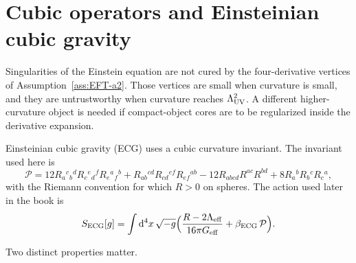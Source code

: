 \section{Cubic operators and Einsteinian cubic gravity}
\label{sec:ch9-ECG}

Singularities of the Einstein equation are not cured by the
four-derivative vertices of Assumption~\ref{ass:EFT-a2}. Those
vertices are small when curvature is small, and they are
untrustworthy when curvature reaches \(\Lambda_{\mathrm{UV}}^2\). A different
higher-curvature object is needed if compact-object cores are to
be regularized inside the derivative expansion.

Einsteinian cubic gravity (ECG) uses a cubic curvature invariant.
The invariant used here is
\begin{equation}
  \label{eq:ECG}
  \mathcal{P}
  =12 R_a{}^c{}_b{}^d R_c{}^e{}_d{}^f R_e{}^a{}_f{}^b
   +R_{ab}{}^{cd}R_{cd}{}^{ef}R_{ef}{}^{ab}
   -12R_{abcd}R^{ac}R^{bd}
   +8R_a{}^bR_b{}^cR_c{}^a,
\end{equation}
with the Riemann convention for which \(R>0\) on spheres. The action
used later in the book is
\begin{equation}
  \label{eq:S-ECG}
  S_{\mathrm{ECG}}[g]
  =\int\mathrm{d}^4x\,\sqrt{-g}
   \Bigl(
     \frac{R-2\Lambda_{\mathrm{eff}}}{16\pi G_{\mathrm{eff}}}
     +\beta_{\mathrm{ECG}}\,\mathcal{P}
   \Bigr).
\end{equation}

Two distinct properties matter.

